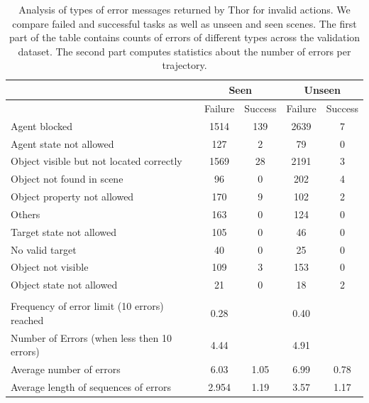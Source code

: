 \documentclass[11pt,a4paper]{article}
\begin{document}
\begin{table}[]
\centering

\begin{tabular}{|l|c|c|c|c|}
\hline
                                             & \multicolumn{2}{c|}{Seen} & \multicolumn{2}{c|}{Unseen} \\ \hline
                                             & Failure     & Success     & Failure      & Success      \\ \hline
Agent blocked                                & 1514        & 139         & 2639         & 7            \\ \hline
Agent state not allowed                      & 127         & 2           & 79           & 0            \\ \hline
Object visible but not located correctly     & 1569        & 28          & 2191         & 3            \\ \hline
Object not found in scene                    & 96          & 0           & 202          & 4            \\ \hline
Object property not allowed                  & 170         & 9           & 102          & 2            \\ \hline
Others                                       & 163         & 0           & 124          & 0            \\ \hline
Target state not allowed                     & 105         & 0           & 46           & 0            \\ \hline
No valid target                              & 40          & 0           & 25           & 0            \\ \hline
Object not visible                           & 109         & 3           & 153          & 0            \\ \hline
Object state not allowed                     & 21          & 0           & 18           & 2            \\ \hline
                                             &             &             &              &              \\ \hline
Frequency of error limit (10 errors) reached & 0.28        &             & 0.40         &              \\ \hline
Number of Errors (when less then 10 errors)  & 4.44        &             & 4.91         &              \\ \hline
Average number of errors                     & 6.03        & 1.05        & 6.99         & 0.78         \\ \hline
Average length of sequences of errors        & 2.954       & 1.19        & 3.57         & 1.17         \\ \hline
\end{tabular}
\caption{Analysis of types of error messages returned by Thor for invalid actions. We compare failed and successful tasks as well as unseen and seen scenes. The first part of the table contains counts of errors of different types across the validation dataset. The second part computes statistics about the number of errors per trajectory.}
\label{tab:error_analysis}
\end{table}
\end{document}
